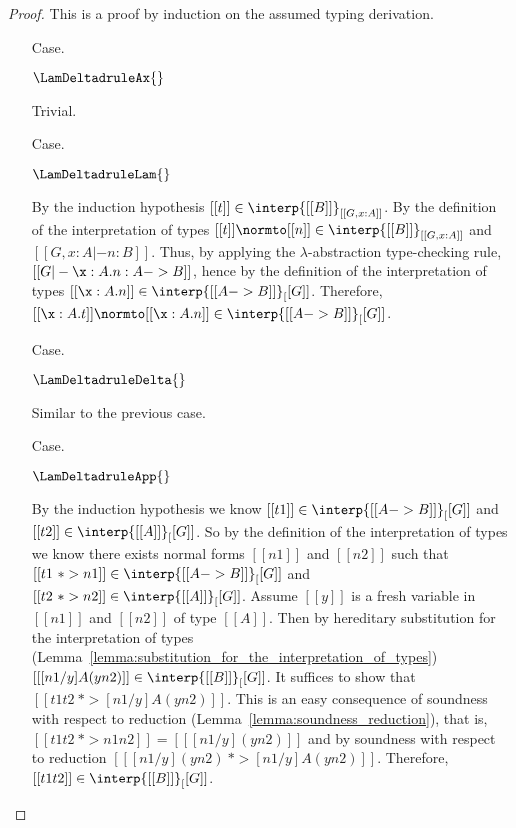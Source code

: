 \begin{proof}
  This is a proof by induction on the assumed typing derivation.
  \begin{itemize}
  \item[Case.] \ \\
    \begin{center}
      $\LamDeltadruleAx{}$
    \end{center}
    Trivial.
    
  \item[Case.] \ \\
    \begin{center}
      $\LamDeltadruleLam{}$
    \end{center}
    By the induction hypothesis $[[t]] \in \interp{[[B]]}_{[[G,x:A]]}$.  By the definition of the
    interpretation of types $[[t]] \normto [[n]] \in \interp{[[B]]}_{[[G,x:A]]}$ and 
    $[[G, x:A |- n:B]]$.  Thus, by applying the $\lambda$-abstraction type-checking
    rule, $[[G |- \x:A.n:A -> B]]$, hence by the definition of the 
    interpretation of types $[[\x:A.n]] \in \interp{[[A -> B]]}_[[G]]$.  Therefore,
    $[[\x:A.t]] \normto [[\x:A.n]] \in \interp{[[A -> B]]}_[[G]]$.
    
  \item[Case.] \ \\
    \begin{center}
      $\LamDeltadruleDelta{}$
    \end{center}
    Similar to the previous case.
    
  \item[Case.] \ \\
    \begin{center}
      $\LamDeltadruleApp{}$
    \end{center}
    
    By the induction hypothesis we know $[[t1]] \in \interp{[[A -> B]]}_[[G]]$ and $[[t2]] \in \interp{[[A]]}_[[G]]$.
    So by the definition of the interpretation of types we know there exists normal forms $[[n1]]$ and $[[n2]]$
    such that $[[t1 ~*> n1]] \in \interp{[[A -> B]]}_[[G]]$ and $[[t2 ~*> n2]] \in \interp{[[A]]}_[[G]]$. Assume $[[y]]$ is a fresh
    variable in $[[n1]]$ and $[[n2]]$ of type $[[A]]$.    
    Then by hereditary 
    substitution for the interpretation of types (Lemma~\ref{lemma:substitution_for_the_interpretation_of_types}) 
    $[[ [n1/y] A (y n2)]] \in \interp{[[B]]}_[[G]]$.  
    It suffices to show that $[[t1 t2 ~*> [n1/y] A (y n2)]]$.  This is an easy consequence of soundness with respect
    to reduction (Lemma~\ref{lemma:soundness_reduction}), that is, $[[t1 t2 ~*> n1 n2]] = [[ [n1/y](y n2)]]$ 
    and by soundness with respect to reduction $[[ [n1/y](y n2) ~*> [n1/y] A (y n2)]]$.  Therefore, 
    $[[t1 t2]] \in \interp{[[B]]}_[[G]]$.  
  \end{itemize}
\end{proof}
